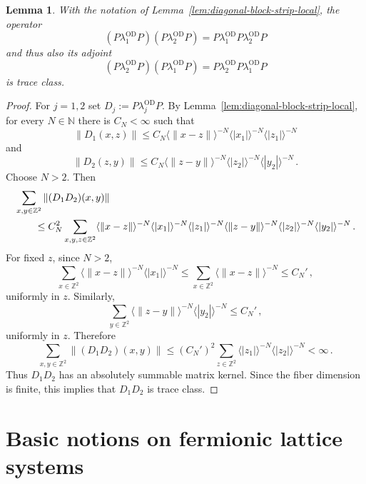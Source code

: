 \documentclass[a4paper]{article}
\newcommand{\N}{\mathbb{N}}
\newcommand{\Z}{\mathbb{Z}}
\newcommand{\OD}[1][]{   ^{\mathrm{OD}#1}   }
\theoremstyle{plain}
\newtheorem{lemma}[theorem]{Lemma}
\theoremstyle{definition}
\theoremstyle{remark}
\renewcommand{\(}{\left(}
\renewcommand{\)}{\right)}
\begin{document}
\begin{lemma}\label{lem:diagonal-block-products-trace-class}
With the notation of Lemma~\ref{lem:diagonal-block-strip-local}, the operator
\[
    (P\lambda_1\OD P)(P\lambda_2\OD P)
    =
    P\lambda_1\OD P\lambda_2\OD P
\]
and thus also its adjoint
\[
    (P\lambda_2\OD P)(P\lambda_1\OD P)
    =
    P\lambda_2\OD P\lambda_1\OD P
\]
is trace class.
\end{lemma}

\begin{proof}
For $j=1,2$ set
    $D_j:=P\lambda_j\OD P$.
By Lemma~\ref{lem:diagonal-block-strip-local}, for every $N\in\N$ there is
$C_N<\infty$ such that
\[
    \|D_1(x,z)\|
    \le
    C_N
    \langle \|x-z\|\rangle^{-N}
    \langle |x_1|\rangle^{-N}
    \langle |z_1|\rangle^{-N}
\]
and
\[ 
    \|D_2(z,y)\|
    \le
    C_N
    \langle \|z-y\|\rangle^{-N}
    \langle |z_2|\rangle^{-N}
    \langle |y_2|\rangle^{-N}\,.
\]
Choose $N>2$. Then
\begin{align*}
    \hspace{2em}&\hspace{-2em}
    \sum_{x,y\in\Z^2}\|(D_1D_2)(x,y)\|
    \\
    &\leq
    C_N^2
    \sum_{x,y,z\in\Z^2}
    \langle \|x-z\|\rangle^{-N}
    \langle |x_1|\rangle^{-N}
    \langle |z_1|\rangle^{-N}    
    \langle \|z-y\|\rangle^{-N}
    \langle |z_2|\rangle^{-N}
    \langle |y_2|\rangle^{-N}\,.
\end{align*}
For fixed $z$, since $N>2$,
\[
    \sum_{x\in\Z^2}
    \langle \|x-z\|\rangle^{-N}
    \langle |x_1|\rangle^{-N}
    \le
    \sum_{x\in\Z^2}
    \langle \|x-z\|\rangle^{-N}
    \le C_N'\,,
\]
uniformly in $z$. Similarly,
\[
    \sum_{y\in\Z^2}
    \langle \|z-y\|\rangle^{-N}
    \langle |y_2|\rangle^{-N}
    \le C_N'\,,
\]
uniformly in $z$. Therefore
\[
    \sum_{x,y\in\Z^2}\|(D_1D_2)(x,y)\|
    \leq
    (C_N')^2
    \sum_{z\in\Z^2}
    \langle |z_1|\rangle^{-N}
    \langle |z_2|\rangle^{-N}
    <\infty\,.
\]
Thus $D_1D_2$ has an absolutely summable matrix kernel. Since the fiber
dimension is finite, this implies that $D_1D_2$ is trace class. 
\end{proof}




 



\appendix


\section{Basic notions on fermionic lattice systems}\label{sec:basic}
\end{document}

